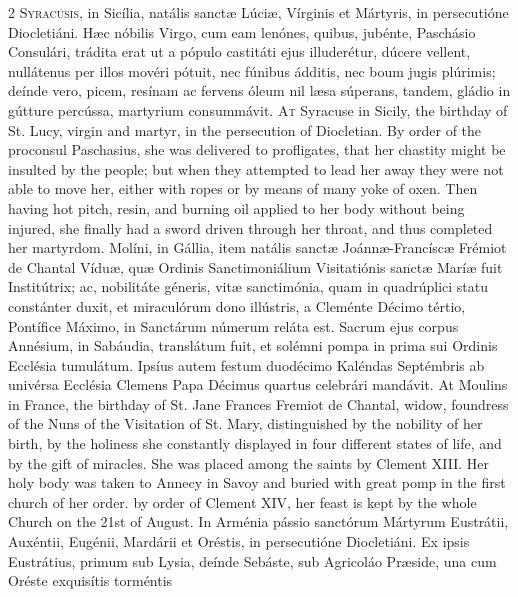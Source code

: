 \begin{paracol}{2}
\lettrine[lines=2]{S}{yracúsis,} in Sicília, 
 natális sanctæ Lúciæ, Vírginis et Mártyris, in persecutióne Diocletiáni. 
 Hæc nóbilis Virgo, cum eam lenónes, quibus, jubénte, Paschásio Consulári, 
 trádita erat ut a pópulo castitáti ejus illuderétur, dúcere vellent, 
 nullátenus per illos movéri pótuit, nec fúnibus ádditis, nec boum jugis 
 plúrimis; deínde vero, picem, resínam ac fervens óleum nil læsa súperans, 
 tandem, gládio in gútture percússa, martyrium consummávit.
\switchcolumn
{}
\lettrine[lines=2]{A}{t} Syracuse in Sicily, the birthday 
 of St. Lucy, virgin and martyr, in the persecution of Diocletian. By 
 order of the proconsul Paschasius, she was delivered to profligates, that 
 her chastity might be insulted by the people; but when they attempted to 
 lead her away they were not able to move her, either with ropes or by means 
 of many yoke of oxen. Then having hot pitch, resin, and burning oil 
 applied to her body without being injured, she finally had a sword driven 
 through her throat, and thus completed her martyrdom.
\switchcolumn*
{}
Molíni, in Gállia, item natális sanctæ Joánnæ-Francíscæ Frémiot de Chantal
  Víduæ, quæ Ordinis Sanctimoniálium Visitatiónis sanctæ Maríæ fuit
  Institútrix; ac, nobilitáte géneris, vitæ sanctimónia, quam in quadrúplici
  statu constánter duxit, et miraculórum dono illústris, a Cleménte Décimo
  tértio, Pontífice Máximo, in Sanctárum númerum reláta est. Sacrum ejus corpus
  Annésium, in Sabáudia, translátum fuit, et solémni pompa in prima sui Ordinis
  Ecclésia tumulátum. Ipsíus autem festum duodécimo Kaléndas Septémbris ab
  univérsa Ecclésia Clemens Papa Décimus quartus celebrári mandávit.
\switchcolumn
{}
At Moulins in France, the birthday 
 of St. Jane Frances Fremiot de Chantal, widow, foundress of the Nuns of the 
 Visitation of St. Mary, distinguished by the nobility of her birth, by the 
 holiness she constantly displayed in four different states of life, and by 
 the gift of miracles. She was placed among the saints by Clement XIII. 
 Her holy body was taken to Annecy in Savoy and buried with great pomp in the 
 first church of her order. by order of Clement XIV, her feast is kept 
 by the whole Church on the 21st of August.
\switchcolumn*
{}
In Arménia pássio 
 sanctórum Mártyrum Eustrátii, Auxéntii, Eugénii, Mardárii et Oréstis, in 
 persecutióne Diocletiáni. Ex ipsis Eustrátius, primum sub Lysia, 
 deínde Sebáste, sub Agricoláo Præside, una cum Oréste exquisítis torméntis 

\end{paracol}

